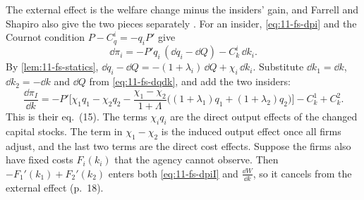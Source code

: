 The external effect is the welfare change minus the insiders' gain, and Farrell and Shapiro also give the two pieces
separately \citep[pp.~18--22]{FarrellShapiro1988}. For an insider, \eqref{eq:11-fs-dpi} and the Cournot condition
$P - C^i_q = -q_iP'$ give
\begin{equation*}
\dd\pi_i = -P'q_i\,(\dd q_i - \dd Q) - C^i_k\,\dd k_i .
\end{equation*}
By \cref{lem:11-fs-statics}, $\dd q_i - \dd Q = -(1 + \lambda_i)\,\dd Q + \chi_i\,\dd k_i$. Substitute $\dd k_1 =
\dd k$, $\dd k_2 = -\dd k$ and $\dd Q$ from \eqref{eq:11-fs-dqdk}, and add the two insiders:
\begin{equation}\label{eq:11-fs-dpiI}
\frac{\dd\pi_I}{\dd k} = -P'\Big[\chi_1q_1 - \chi_2q_2 - \frac{\chi_1 - \chi_2}{1 + \Lambda}\big((1 + \lambda_1)q_1 +
(1 + \lambda_2)q_2\big)\Big] - C^1_k + C^2_k .
\end{equation}
This is their eq.~(15). The terms $\chi_iq_i$ are the direct output effects of the changed capital stocks. The term
in $\chi_1 - \chi_2$ is the induced output effect once all firms adjust, and the last two terms are the direct cost
effects. Suppose the firms also have fixed costs $F_i(k_i)$ that the agency cannot observe. Then
$-F_1'(k_1) + F_2'(k_2)$ enters both \eqref{eq:11-fs-dpiI} and $\frac{\dd W}{\dd k}$, so it cancels from the
external effect (p.~18).

